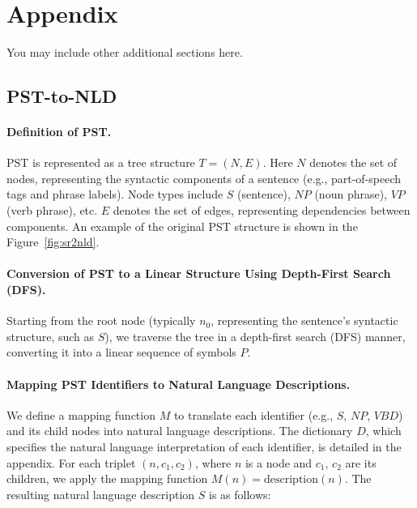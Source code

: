 \appendix
\section{Appendix}
You may include other additional sections here.

\subsection{PST-to-NLD}
\paragraph{Definition of PST.}
    PST is represented as a tree structure \( T = (N, E) \). Here \( N \) denotes the set of nodes, representing the syntactic components of a sentence (e.g., part-of-speech tags and phrase labels). Node types include \( S \) (sentence), \( NP \) (noun phrase), \( VP \) (verb phrase), etc.  \( E \) denotes the set of edges, representing dependencies between components.
    An example of the original PST structure is shown in the Figure~\ref{fig:sr2nld}.

\paragraph{Conversion of PST to a Linear Structure Using Depth-First Search (DFS).}
    Starting from the root node (typically \( n_0 \), representing the sentence's syntactic structure, such as \( S \)), we traverse the tree in a depth-first search (DFS) manner, converting it into a linear sequence of symbols \( P \).
    

\paragraph{Mapping PST Identifiers to Natural Language Descriptions.}
    We define a mapping function \( M \) to translate each identifier (e.g., \( S \), \( NP \), \( VBD \)) and its child nodes into natural language descriptions. The dictionary \( D \), which specifies the natural language interpretation of each identifier, is detailed in the appendix. For each triplet \( (n, c_1, c_2) \), where \( n \) is a node and \( c_1 \), \( c_2 \) are its children, we apply the mapping function \( M(n) = \text{description}(n) \). The resulting natural language description \( S \) is as follows:
    
